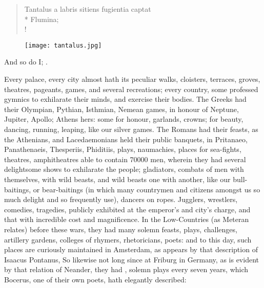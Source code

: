 {\begin{latin}
\begin{verse}%
Tantalus a labris sitiens fugientia captat\\*
Flumina;\\!
\end{verse}%
\end{latin}

\begin{figure}[h]
  \begingroup
  \centering
  \texttt{[image: tantalus.jpg]}
  \label{fig:tantalus}
\end{figure}

And so do I; .

Every palace, every city almost hath its peculiar walks, cloisters, terraces, groves, theatres, pageants, games, and several recreations; every country, some professed gymnics to exhilarate their minds, and exercise their bodies. The Greeks had their Olympian, Pythian, Isthmian, Nemean games, in honour of Neptune, Jupiter, Apollo; Athens hers: some for honour, garlands, crowns; for beauty, dancing, running, leaping, like our silver games. The Romans had their feasts, as the Athenians, and Lacedaemonians held their public banquets, in Pritanaeo, Panathenaeis, Thesperiis, Phiditiis, plays, naumachies, places for sea-fights, theatres, amphitheatres able to contain 70\thinspace{}000 men, wherein they had several delightsome shows to exhilarate the people; gladiators, combats of men with themselves, with wild beasts, and wild beasts one with another, like our bull-baitings, or bear-baitings (in which many countrymen and citizens amongst us so much delight and so frequently use), dancers on ropes. Jugglers, wrestlers, comedies, tragedies, publicly exhibited at the emperor's and city's charge, and that with incredible cost and magnificence. In the Low-Countries (as Meteran relates) before these wars, they had many solemn feasts, plays, challenges, artillery gardens, colleges of rhymers, rhetoricians, poets: and to this day, such places are curiously maintained in Amsterdam, as appears by that description of Isaacus Pontanus,  So likewise not long since at Friburg in Germany, as is evident by that relation of Neander, they had , solemn plays every seven years, which Bocerus, one of their own poets, hath elegantly described:

}
